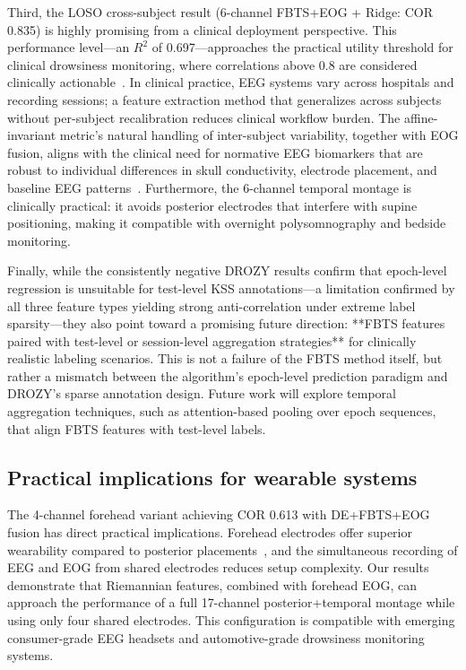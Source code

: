 \documentclass{iopjournal}
\begin{document}
Third, the LOSO cross-subject result (6-channel FBTS+EOG + Ridge: COR 0.835) is highly promising from a clinical deployment perspective. This performance level---an $R^2$ of 0.697---approaches the practical utility threshold for clinical drowsiness monitoring, where correlations above 0.8 are considered clinically actionable~\cite{kaida2006validation}. In clinical practice, EEG systems vary across hospitals and recording sessions; a feature extraction method that generalizes across subjects without per-subject recalibration reduces clinical workflow burden. The affine-invariant metric's natural handling of inter-subject variability, together with EOG fusion, aligns with the clinical need for normative EEG biomarkers that are robust to individual differences in skull conductivity, electrode placement, and baseline EEG patterns~\cite{babiloni2020international}. Furthermore, the 6-channel temporal montage is clinically practical: it avoids posterior electrodes that interfere with supine positioning, making it compatible with overnight polysomnography and bedside monitoring.

Finally, while the consistently negative DROZY results confirm that epoch-level regression is unsuitable for test-level KSS annotations---a limitation confirmed by all three feature types yielding strong anti-correlation under extreme label sparsity---they also point toward a promising future direction: **FBTS features paired with test-level or session-level aggregation strategies** for clinically realistic labeling scenarios. This is not a failure of the FBTS method itself, but rather a mismatch between the algorithm's epoch-level prediction paradigm and DROZY's sparse annotation design. Future work will explore temporal aggregation techniques, such as attention-based pooling over epoch sequences, that align FBTS features with test-level labels.

\subsection{Practical implications for wearable systems}

The 4-channel forehead variant achieving COR 0.613 with DE+FBTS+EOG fusion has direct practical implications. Forehead electrodes offer superior wearability compared to posterior placements~\cite{zhang2015forehead}, and the simultaneous recording of EEG and EOG from shared electrodes reduces setup complexity. Our results demonstrate that Riemannian features, combined with forehead EOG, can approach the performance of a full 17-channel posterior+temporal montage while using only four shared electrodes. This configuration is compatible with emerging consumer-grade EEG headsets and automotive-grade drowsiness monitoring systems.
\end{document}

